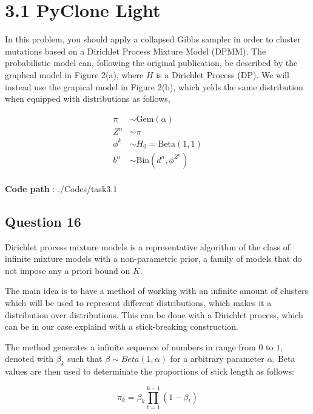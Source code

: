 \documentclass[]{article}
\begin{document}
	
	\newpage
	
	\section*{3.1 PyClone Light}
	
	In this problem, you should apply a collapsed Gibbs sampler in order to cluster mutations based on a Dirichlet Process Mixture Model (DPMM). The probabilistic model can, following the original publication, be described by the graphcal model in Figure 2(a), where $H$ is a Dirichlet Process (DP). We will instead use the grapical model in Figure 2(b), which yelds the same distribution when equipped with distributions as follows,
	
	
	\begin{equation}
	\begin{aligned}
	\pi &\sim \text{Gem}(\alpha) \\
	Z^n &\sim \pi \\
	\phi^k &\sim H_0 = \text{Beta}(1,1) \\
	b^n &\sim \text{Bin}(d^n, \phi^{Z^n})\\
	\end{aligned}
	\end{equation}
	
	\textbf{Code path} : ./Codes/task3.1  
	
	\subsection*{Question 16}
	
	Dirichlet process mixture models is a representative algorithm of the class of infinite mixture models with a non-parametric prior, a family of models that do not impose any a priori bound on $K$.
	
	The main idea is to have a method of working with an infinite amount of clusters which will be used to represent different distributions, which makes it a distribution over distributions. This can be done with a Dirichlet process, which can be in our case explaind with a stick-breaking construction. 
	
	The method generates a infinite sequence of numbers in range from $0$ to $1$, denoted with $\beta_k$ such that $ \beta \sim Beta(1,\alpha)$ for a arbitrary parameter $\alpha$. Beta values are then used to determinate the proportions of stick length as follows:
	
	$$ \pi_k = \beta_k \prod_{t=1}^{k-1} (1-\beta_t)$$
	
\end{document}

